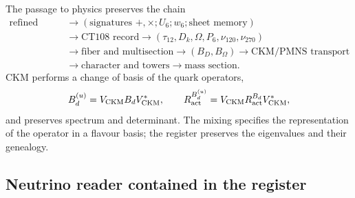 The passage to physics preserves the chain
\begin{equation}
 \begin{aligned}
 \text{refined seed}
 &\longrightarrow(\text{signatures }+,\times;U_6;w_6;
                   \text{sheet memory})\\
 &\longrightarrow\text{CT108 record}
 \longrightarrow(\tau_{12},D_k,\Omega,P_6,\nu_{120},\nu_{270})\\
 &\longrightarrow\text{fiber and multisection}
 \longrightarrow(B_D,B_\Omega)
 \longrightarrow\text{CKM/PMNS transport}\\
 &\longrightarrow\text{character and towers}
 \longrightarrow\text{mass section}.
 \end{aligned}
 \label{eq:cadena-semilla-mezcla-masa-autonoma}
\end{equation}
CKM performs a change of basis of the quark operators,
\begin{equation}
 B_d^{(u)}=V_{\rm CKM}B_dV_{\rm CKM}^*,
 \qquad
 R_{\rm act}^{B_d^{(u)}}
 =V_{\rm CKM}R_{\rm act}^{B_d}V_{\rm CKM}^*,
 \label{eq:ckm-transporte-semillas-autonoma}
\end{equation}
and preserves spectrum and determinant. The mixing specifies the representation
of the operator in a flavour basis; the register preserves the eigenvalues and their
genealogy.

\subsection{Neutrino reader contained in the register}

